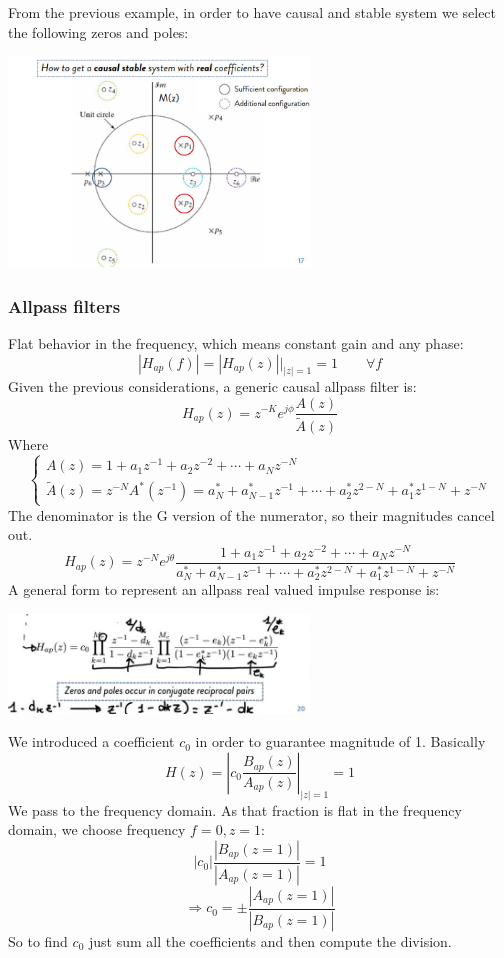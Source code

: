 From the previous example, in order to have causal and stable system we select the following zeros and poles:
\begin{center}
    \includegraphics[width=0.6\textwidth]{images/magnitued_square2.png}
\end{center}

\subsubsection{Allpass filters}
Flat behavior in the frequency, which means constant gain and any phase:
$$
|H_{ap}(f)|=|H_{ap}(z)|\big|_{|z|=1}=1\qquad\forall f
$$
Given the previous considerations, a generic causal allpass filter is:
$$
H_{ap}(z)=z^{-K}e^{j\phi}\frac{A(z)}{\tilde{A}(z)}
$$
Where
$$
\begin{cases}
    A(z)=1+a_1z^{-1}+a_2z^{-2}+\cdots+a_Nz^{-N}\\
    \tilde{A}(z)=z^{-N}A^*(z^{-1})=a^*_N+a_{N-1}^*z^{-1}+\cdots+a_2^*z^{2-N}+a_1^*z^{1-N}+z^{-N}
\end{cases}
$$
The denominator is the G version of the numerator, so their magnitudes cancel out.
$$
H_{ap}(z)=z^{-N}e^{j\theta}
\frac{
    1+a_1z^{-1}+a_2z^{-2}+\cdots+a_Nz^{-N}
}{
    a^*_N+a_{N-1}^*z^{-1}+\cdots+a_2^*z^{2-N}+a_1^*z^{1-N}+z^{-N}
}
$$
A general form to represent an allpass real valued impulse response is:
\begin{center}
    \includegraphics[width=0.6\textwidth]{images/allpass.png}
\end{center}
We introduced a coefficient $c_0$ in order to guarantee magnitude of 1. Basically
$$
H(z)=\left|c_0\frac{B_{ap}(z)}{A_{ap}(z)}\right|_{|z|=1}=1
$$
We pass to the frequency domain. As that fraction is flat in the frequency domain, we choose frequency $f=0,z=1$:
$$
|c_0|\frac{|B_{ap}(z=1)|}{|A_{ap}(z=1)|}=1
$$
$$
\Rightarrow c_0 = \pm\frac{|A_{ap}(z=1)|}{|B_{ap}(z=1)|}
$$
So to find $c_0$ just sum  all the coefficients and then compute the division.


